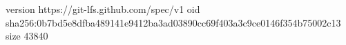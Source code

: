 version https://git-lfs.github.com/spec/v1
oid sha256:0b7bd5e8dfba489141e9412ba3ad03890cc69f403a3c9ce0146f354b75002c13
size 43840
